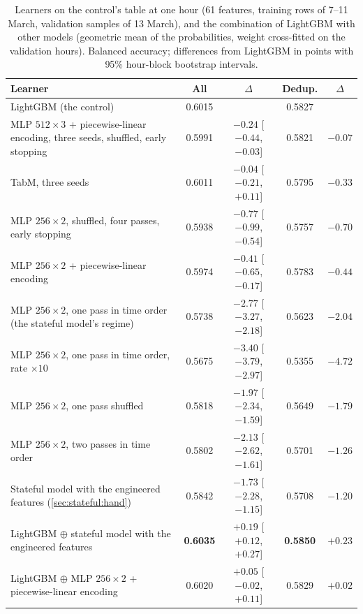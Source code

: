 \begin{table}[t]
\centering
\caption{Learners on the control's table at one hour (61 features, training rows of 7--11
March, validation samples of 13 March), and the combination of LightGBM with other models
(geometric mean of the probabilities, weight cross-fitted on the validation hours).  Balanced
accuracy; differences from LightGBM in points with 95\% hour-block bootstrap intervals.}
\label{tab:exp:learners}
\small
\begin{fittable}\begin{tabular}{lcccc}
\toprule
Learner & All & $\Delta$ & Dedup. & $\Delta$ \\
\midrule
LightGBM (the control) & 0.6015 & & 0.5827 & \\
MLP $512 \times 3$ + piecewise-linear encoding, three seeds, shuffled, early stopping & 0.5991 & $-0.24$ [$-0.44$, $-0.03$] & 0.5821 & $-0.07$ \\
TabM, three seeds & 0.6011 & $-0.04$ [$-0.21$, $+0.11$] & 0.5795 & $-0.33$ \\
\midrule
MLP $256 \times 2$, shuffled, four passes, early stopping & 0.5938 & $-0.77$ [$-0.99$, $-0.54$] & 0.5757 & $-0.70$ \\
MLP $256 \times 2$ + piecewise-linear encoding & 0.5974 & $-0.41$ [$-0.65$, $-0.17$] & 0.5783 & $-0.44$ \\
MLP $256 \times 2$, one pass in time order (the stateful model's regime) & 0.5738 & $-2.77$ [$-3.27$, $-2.18$] & 0.5623 & $-2.04$ \\
MLP $256 \times 2$, one pass in time order, rate $\times 10$ & 0.5675 & $-3.40$ [$-3.79$, $-2.97$] & 0.5355 & $-4.72$ \\
MLP $256 \times 2$, one pass shuffled & 0.5818 & $-1.97$ [$-2.34$, $-1.59$] & 0.5649 & $-1.79$ \\
MLP $256 \times 2$, two passes in time order & 0.5802 & $-2.13$ [$-2.62$, $-1.61$] & 0.5701 & $-1.26$ \\
Stateful model with the engineered features (\cref{sec:stateful:hand}) & 0.5842 & $-1.73$ [$-2.28$, $-1.15$] & 0.5708 & $-1.20$ \\
\midrule
LightGBM $\oplus$ stateful model with the engineered features & \textbf{0.6035} & $+0.19$ [$+0.12$, $+0.27$] & \textbf{0.5850} & $+0.23$ \\
LightGBM $\oplus$ MLP $256 \times 2$ + piecewise-linear encoding & 0.6020 & $+0.05$ [$-0.02$, $+0.11$] & 0.5829 & $+0.02$ \\
\bottomrule
\end{tabular}\end{fittable}
\end{table}

